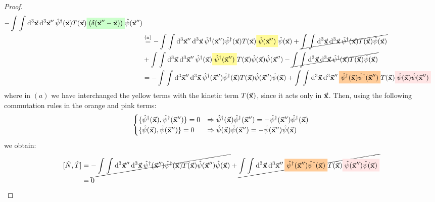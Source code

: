 \documentclass[11pt, a4paper, twoside, openright]{article}
\begin{document}
\begin{proof}
\begin{equation*}
\begin{split}
      - \int_{}^{} \int_{}^{} \dd[3]{\va{x}} \dd[3]{\va{x}''} \hat{\psi } ^\dag  (\va{x}) T (\va{x}) \mathcolorbox{green!20}{  \qty( \delta (\va{x}''-\va{x}) ) } \hat{\psi }(\va{x}'') \\
      & \overset{(a)}{=}
      - \int_{}^{} \int_{}^{} \dd[3]{\va{x}''} \dd[3]{\va{x}}  \hat{\psi }^\dag (\va{x}'')  \hat{\psi }^\dag (\va{x}) T (\va{x}) \mathcolorbox{yellow!40}{\hat{\psi } (\va{x}'')}
       \hat{\psi }(\va{x})
      + \cancel{ \int_{}^{} \int_{}^{} \dd[3]{\va{x}} \dd[3]{\va{x}}  \hat{\psi }^\dag (\va{x}) T (\va{x}) \hat{\psi }(\va{x}) }
      \\
      &+
      \int_{}^{} \int_{}^{} \dd[3]{\va{x}} \dd[3]{\va{x}''} \hat{\psi } ^\dag  (\va{x})  \mathcolorbox{yellow!40}{ \hat{\psi }^\dag (\va{x}'') } T (\va{x})  \hat{\psi } (\va{x}) \hat{\psi }(\va{x}'')
      - \cancel{ \int_{}^{} \int_{}^{} \dd[3]{\va{x}} \dd[3]{\va{x}} \hat{\psi } ^\dag  (\va{x}) T (\va{x}) \hat{\psi }(\va{x}) }  \\
      & =
      - \int_{}^{} \int_{}^{} \dd[3]{\va{x}''} \dd[3]{\va{x}}  \hat{\psi }^\dag (\va{x}'')  \hat{\psi }^\dag (\va{x})
      T (\va{x}) \hat{\psi } (\va{x}'') \hat{\psi }(\va{x})
      +
      \int_{}^{} \int_{}^{} \dd[3]{\va{x}} \dd[3]{\va{x}''} \mathcolorbox{orange!40}{ \hat{\psi } ^\dag  (\va{x})   \hat{\psi }^\dag (\va{x}'') } T (\va{x})  \mathcolorbox{pink!40}{ \hat{\psi } (\va{x}) \hat{\psi }(\va{x}'') }
\end{split}
\end{equation*}
where in \( (a) \) we have interchanged the yellow terms with the kinetic term \( T(\va{x}) \), since it acts only in \( \va{x} \).
Then, using the following commutation rules in the orange and pink terms:
\begin{equation}
  \begin{cases}
   \{ \hat{\psi } ^\dag (\va{x}), \hat{\psi }^\dag (\va{x}'') \}=0 & \Rightarrow  \hat{\psi } ^\dag (\va{x}) \hat{\psi }^\dag (\va{x}'') = - \hat{\psi }^\dag (\va{x}'') \hat{\psi } ^\dag (\va{x}) \\
   \{ \hat{\psi }  (\va{x}), \hat{\psi }(\va{x}'') \}=0 & \Rightarrow  \hat{\psi }  (\va{x}) \hat{\psi } (\va{x}'') = - \hat{\psi } (\va{x}'') \hat{\psi } (\va{x})
  \end{cases}
  \label{eq:anticommutator_0}
\end{equation}
we obtain:
\begin{equation*}
\begin{split}
  [\hat{N},\hat{T}  ] &=
    \cancel{- \int_{}^{} \int_{}^{} \dd[3]{\va{x}''} \dd[3]{\va{x}}  \hat{\psi }^\dag (\va{x}'')  \hat{\psi }^\dag (\va{x})
    T (\va{x}) \hat{\psi } (\va{x}'') \hat{\psi }(\va{x})}
    +
    \cancel{\int_{}^{} \int_{}^{} \dd[3]{\va{x}} \dd[3]{\va{x}''} \mathcolorbox{orange!40}{    \hat{\psi }^\dag (\va{x}'') \hat{\psi } ^\dag  (\va{x}) } T (\va{x})  \mathcolorbox{pink!40}{  \hat{\psi }(\va{x}'') \hat{\psi } (\va{x}) }} \\
    &= 0
\end{split}
\end{equation*}


\end{proof}
\end{document}
